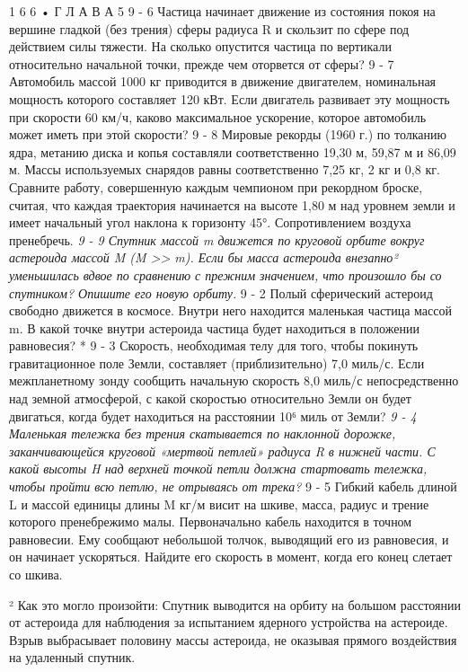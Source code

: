 \documentclass[10pt,oneside]{article}
\begin{document}
1 6 6 • Г Л А В А  5 \emph{ } 9 - 6 Частица начинает движение из состояния покоя на вершине гладкой (без трения) сферы радиуса R и скользит по сфере под действием силы тяжести. На сколько опустится частица по вертикали относительно начальной точки, прежде чем оторвется от сферы? \emph{ } 9 - 7 Автомобиль массой 1000 кг приводится в движение двигателем, номинальная мощность которого составляет 120 кВт. Если двигатель развивает эту мощность при скорости 60 км/ч, каково максимальное ускорение, которое автомобиль может иметь при этой скорости? \emph{ } 9 - 8 Мировые рекорды (1960 г.) по толканию ядра, метанию диска и копья составляли соответственно 19,30 м, 59,87 м и 86,09 м. Массы используемых снарядов равны соответственно 7,25 кг, 2 кг и 0,8 кг. Сравните работу, совершенную каждым чемпионом при рекордном броске, считая, что каждая траектория начинается на высоте 1,80 м над уровнем земли и имеет начальный угол наклона к горизонту 45°. Сопротивлением воздуха пренебречь. \emph{ } \emph{ 9 - 9 Спутник массой m движется по круговой орбите вокруг астероида массой M (M >> m). Если бы масса астероида внезапно² уменьшилась вдвое по сравнению с прежним значением, что произошло бы со спутником? Опишите его новую орбиту. } 9 - 2 Полый сферический астероид свободно движется в космосе. Внутри него находится маленькая частица массой m. В какой точке внутри астероида частица будет находиться в положении равновесия? * 9 - 3 Скорость, необходимая телу для того, чтобы покинуть гравитационное поле Земли, составляет (приблизительно) 7,0 миль/с. Если межпланетному зонду сообщить начальную скорость 8,0 миль/с непосредственно над земной атмосферой, с какой скоростью относительно Земли он будет двигаться, когда будет находиться на расстоянии 10⁶ миль от Земли? \emph{ 9 - 4 Маленькая тележка без трения скатывается по наклонной дорожке, заканчивающейся круговой «мертвой петлей» радиуса R в нижней части. С какой высоты H над верхней точкой петли должна стартовать тележка, чтобы пройти всю петлю, не отрываясь от трека? } 9 - 5 Гибкий кабель длиной L и массой единицы длины M кг/м висит на шкиве, масса, радиус и трение которого пренебрежимо малы. Первоначально кабель находится в точном равновесии. Ему сообщают небольшой толчок, выводящий его из равновесия, и он начинает ускоряться. Найдите его скорость в момент, когда его конец слетает со шкива.\par

² Как это могло произойти: Спутник выводится на орбиту на большом расстоянии от астероида для наблюдения за испытанием ядерного устройства на астероиде. Взрыв выбрасывает половину массы астероида, не оказывая прямого воздействия на удаленный спутник.\par
\end{document}
